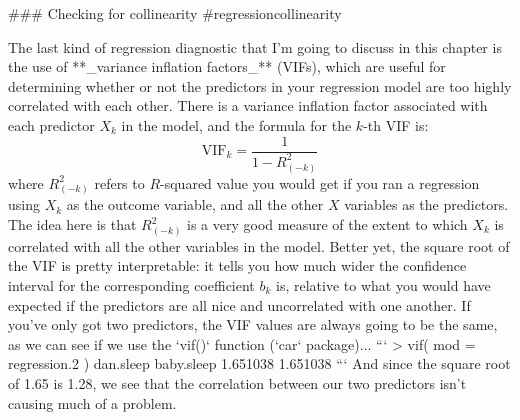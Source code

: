 
%
%

%
%


### Checking for collinearity {#regressioncollinearity}

The last kind of regression diagnostic that I'm going to discuss in this chapter is the use of **_variance inflation factors_** (VIFs), which are useful for determining whether or not the predictors in your regression model are too highly correlated with each other. There is a variance inflation factor associated with each predictor $X_k$ in the model, and the formula for the $k$-th VIF is:
$$
\mbox{VIF}_k = \frac{1}{1-{R^2_{(-k)}}}
$$
where $R^2_{(-k)}$ refers to $R$-squared value you would get if you ran a regression using $X_k$ as the outcome variable, and all the other $X$ variables as the predictors. The idea here is that $R^2_{(-k)}$ is a very good measure of the extent to which $X_k$ is correlated with all the other variables in the model. Better yet, the square root of the VIF is pretty interpretable: it tells you how much wider the confidence interval for the corresponding coefficient $b_k$ is, relative to what you would have expected if the predictors are all nice and uncorrelated with one another. If you've only got two predictors, the VIF values are always going to be the same, as we can see if we use the `vif()` function (`car` package)...
```
> vif( mod = regression.2 )
 dan.sleep baby.sleep 
  1.651038   1.651038 
```
And since the square root of 1.65 is 1.28, we see that the correlation between our two predictors isn't causing much of a problem. 

